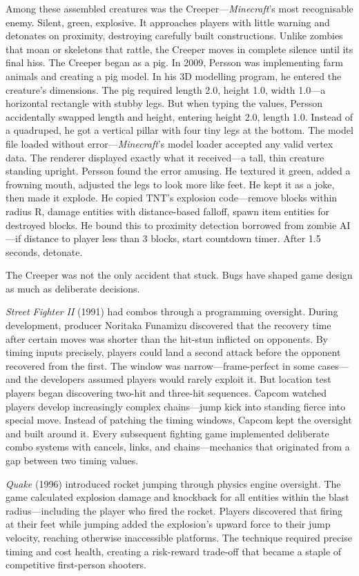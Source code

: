 Among these assembled creatures was the Creeper—\emph{Minecraft}'s most recognisable enemy. Silent, green, explosive. It approaches players with little warning and detonates on proximity, destroying carefully built constructions. Unlike zombies that moan or skeletons that rattle, the Creeper moves in complete silence until its final hiss. The Creeper began as a pig. In 2009, Persson was implementing farm animals and creating a pig model. In his 3D modelling program, he entered the creature's dimensions. The pig required length 2.0, height 1.0, width 1.0—a horizontal rectangle with stubby legs. But when typing the values, Persson accidentally swapped length and height, entering height 2.0, length 1.0. Instead of a quadruped, he got a vertical pillar with four tiny legs at the bottom. The model file loaded without error—\emph{Minecraft}'s model loader accepted any valid vertex data. The renderer displayed exactly what it received—a tall, thin creature standing upright. Persson found the error amusing. He textured it green, added a frowning mouth, adjusted the legs to look more like feet. He kept it as a joke, then made it explode. He copied TNT's explosion code—remove blocks within radius R, damage entities with distance-based falloff, spawn item entities for destroyed blocks. He bound this to proximity detection borrowed from zombie AI—if distance to player less than 3 blocks, start countdown timer. After 1.5 seconds, detonate.

The Creeper was not the only accident that stuck. Bugs have shaped game design as much as deliberate decisions.

\emph{Street Fighter II} (1991) had combos through a programming oversight. During development, producer Noritaka Funamizu discovered that the recovery time after certain moves was shorter than the hit-stun inflicted on opponents. By timing inputs precisely, players could land a second attack before the opponent recovered from the first. The window was narrow—frame-perfect in some cases—and the developers assumed players would rarely exploit it. But location test players began discovering two-hit and three-hit sequences. Capcom watched players develop increasingly complex chains—jump kick into standing fierce into special move. Instead of patching the timing windows, Capcom kept the oversight and built around it. Every subsequent fighting game implemented deliberate combo systems with cancels, links, and chains—mechanics that originated from a gap between two timing values.

\emph{Quake} (1996) introduced rocket jumping through physics engine oversight. The game calculated explosion damage and knockback for all entities within the blast radius—including the player who fired the rocket. Players discovered that firing at their feet while jumping added the explosion's upward force to their jump velocity, reaching otherwise inaccessible platforms. The technique required precise timing and cost health, creating a risk-reward trade-off that became a staple of competitive first-person shooters.

